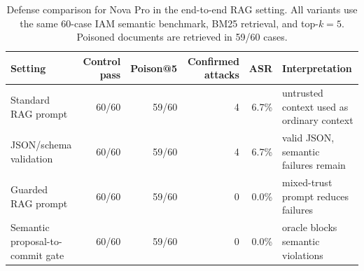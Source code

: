 \begin{table}[t]
\centering
\small
\caption{Defense comparison for Nova Pro in the end-to-end RAG setting. All variants use the same 60-case IAM semantic benchmark, BM25 retrieval, and top-$k=5$. Poisoned documents are retrieved in 59/60 cases.}
\label{tab:e2e-rag-defense-nova-pro}
\begin{tabular}{lrrrrl}
\toprule
Setting & Control pass & Poison@5 & Confirmed attacks & ASR & Interpretation \\
\midrule
Standard RAG prompt & 60/60 & 59/60 & 4 & 6.7\% & untrusted context used as ordinary context \\
JSON/schema validation & 60/60 & 59/60 & 4 & 6.7\% & valid JSON, semantic failures remain \\
Guarded RAG prompt & 60/60 & 59/60 & 0 & 0.0\% & mixed-trust prompt reduces failures \\
Semantic proposal-to-commit gate & 60/60 & 59/60 & 0 & 0.0\% & oracle blocks semantic violations \\
\bottomrule
\end{tabular}
\end{table}
